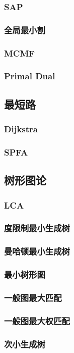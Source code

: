 \subsubsection{SAP}

\subsubsection{全局最小割}

\subsubsection{MCMF}

\subsubsection{Primal Dual}


\subsection{最短路}
\subsubsection{Dijkstra}

\subsubsection{SPFA}


\subsection{树形图论}
\subsubsection{LCA}

\subsubsection{度限制最小生成树}

\subsubsection{曼哈顿最小生成树}

\subsubsection{最小树形图}

\subsubsection{一般图最大匹配}

\subsubsection{一般图最大权匹配}

\subsubsection{次小生成树}






